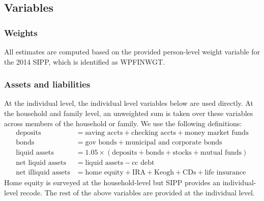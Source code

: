 \documentclass{article}
\begin{document}
\subsection{Variables}

\subsubsection{Weights}
All estimates are computed based on the provided person-level weight variable for the 2014 SIPP, which is identified as WPFINWGT.

\subsubsection{Assets and liabilities}
At the individual level, the individual level variables below are used directly. At the household and family level, an unweighted sum is taken over these variables across members of the household or family.
We use the following definitions:
\begin{align*}
\text{deposits} &= \text{saving accts} + \text{checking accts} + \text{money market funds} \\
\text{bonds} &= \text{gov bonds} + \text{municipal and corporate bonds} \\
\text{liquid assets} &= 1.05 \times (\text{deposits} + \text{bonds} + \text{stocks} + \text{mutual funds}) \\
\text{net liquid assets} &= \text{liquid assets} - \text{cc debt} \\
\text{net illiquid assets} &= \text{home equity} + \text{IRA} + \text{Keogh} + \text{CDs} + \text{life insurance}
\end{align*}
Home equity is surveyed at the household-level but SIPP provides an individual-level recode. The rest of the above variables are provided at the individual level.

\newcommand{\eqindent}{\\ \indent \hspace{4pt} = }
\newcommand{\listassets}[1]{sum(TJS{#1}VAL TJO{#1}VAL TO{#1}VAL)}
\end{document}
